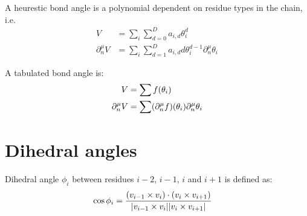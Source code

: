 \documentclass{article}
\DeclarePairedDelimiter{\brk}{(}{)}
\DeclarePairedDelimiter{\norm}{\lvert}{\rvert}
\newcommand{\cross}{\times}
\begin{document}
  A heurestic bond angle is a polynomial dependent on residue types in the chain, i.e.
  \begin{align*}
    V &= \sum_i \sum_{d=0}^D a_{i,d} \theta_i^d\\
    \partial_n^\mu V &= \sum_i \sum_{d=1}^D a_{i,d} d\theta_i^{d-1} \partial_n^\mu \theta_i
  \end{align*}

  A tabulated bond angle is:
  \begin{align*}
    V &= \sum f(\theta_i)\\
    \partial_n^\mu V &= \sum \brk*{\partial_n^\mu f}(\theta_i) \partial_n^\mu \theta_i 
  \end{align*}

  \section*{Dihedral angles}
  Dihedral angle $\phi_i$ between residues $i-2$, $i-1$, $i$ and $i+1$ is defined as:
  \begin{align*}
    \cos{\phi_i} &= \frac{\brk*{v_{i-1}\cross v_i}\cdot\brk*{v_i\cross v_{i+1}}}{\norm{v_{i-1}\cross v_i}\norm{v_i\cross v_{i+1}}}
  \end{align*}
\end{document}
